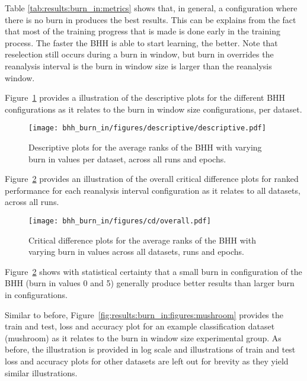 Table \ref{tab:results:burn_in:metrics} shows that, in general, a configuration where there is no burn in produces the best results. This can be explains from the fact that most of the training progress that is made is done early in the training process. The faster the \acs{BHH} is able to start learning, the better. Note that reselection still occurs during a burn in window, but burn in overrides the reanalysis interval is the burn in window size is larger than the reanalysis window.

Figure~\ref{fig:results:burn_in:descriptive:descriptive} provides a illustration of the descriptive plots for the different \acs{BHH} configurations as it relates to the burn in window size configurations, per dataset.

\begin{figure}[htbp]
	\centering
	\texttt{[image: bhh\_burn\_in/figures/descriptive/descriptive.pdf]}
	\caption{Descriptive plots for the average ranks of the \acs{BHH} with varying burn in values per dataset, across all runs and epochs.}
	\label{fig:results:burn_in:descriptive:descriptive}
\end{figure}

Figure~\ref{fig:results:burn_in:descriptive:cd} provides an illustration of the overall critical difference plots for ranked performance for each reanalysis interval configuration as it relates to all datasets, across all runs.

\begin{figure}[htbp]
	\centering
	\texttt{[image: bhh\_burn\_in/figures/cd/overall.pdf]}
	\caption{Critical difference plots for the average ranks of the \acs{BHH} with varying burn in values across all datasets, runs and epochs.}
	\label{fig:results:burn_in:descriptive:cd}
\end{figure}

Figure~\ref{fig:results:burn_in:descriptive:cd} shows with statistical certainty that a small burn in configuration of the \acs{BHH} (burn in values 0 and 5) generally produce better results than larger burn in configurations.


Similar to before, Figure~\ref{fig:results:burn_in:figures:mushroom} provides the train and test, loss and accuracy plot for an example classification dataset (mushroom) as it relates to the burn in window  size experimental group. As before, the illustration is provided in log scale and illustrations of train and test loss and accuracy plots for other datasets are left out for brevity as they yield similar illustrations.

